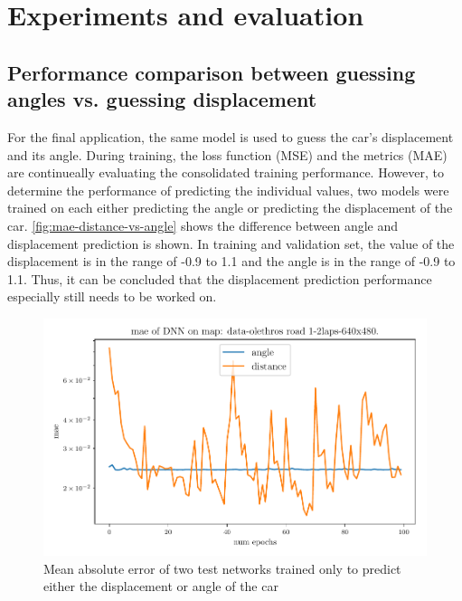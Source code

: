 \documentclass[10pt,a4paper,twoside,journal]{IEEEtran}
\begin{document}
\section{Experiments and evaluation}
\label{sc:evaluation}

\subsection{Performance comparison between guessing angles vs. guessing displacement}
For the final application, the same model is used to guess the car's displacement and its angle. During training, the loss function (MSE) and the metrics (MAE) are continueally evaluating the consolidated training performance. However, to determine the performance of predicting the individual values, two models were trained on each either predicting the angle or predicting the displacement of the car. \autoref{fig:mae-distance-vs-angle} shows the difference between angle and displacement prediction is shown. In training and validation set, the value of the displacement is in the range of -0.9 to 1.1 and the angle is in the range of -0.9 to 1.1. Thus, it can be concluded that the displacement prediction performance especially still needs to be worked on. 

\begin{figure}[ht]
	\centering
	\includegraphics[width=\columnwidth]{attachments/alexnet-val_mae-angle_dist_comp-05425-86589.pdf}
	\caption{Mean absolute error of two test networks trained only to predict either the displacement or angle of the car}
	\label{fig:mae-distance-vs-angle}
\end{figure}
\end{document}
